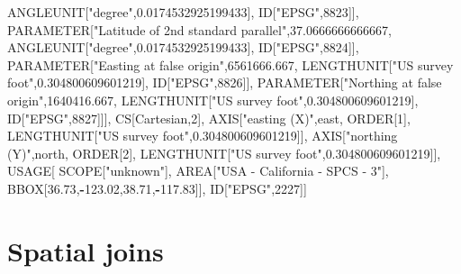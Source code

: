 \documentclass[
  12pt,
]{book}
\newenvironment{Shaded}{\begin{snugshade}}{\end{snugshade}}
\newcommand{\DecValTok}[1]{\textcolor[rgb]{0.00,0.00,0.81}{#1}}
\newcommand{\FloatTok}[1]{\textcolor[rgb]{0.00,0.00,0.81}{#1}}
\newcommand{\NormalTok}[1]{#1}
\newcommand{\OperatorTok}[1]{\textcolor[rgb]{0.81,0.36,0.00}{\textbf{#1}}}
\newcommand{\StringTok}[1]{\textcolor[rgb]{0.31,0.60,0.02}{#1}}
\begin{document}
\begin{Shaded}
\begin{Highlighting}[]
\NormalTok{            ANGLEUNIT[}\StringTok{"degree"}\NormalTok{,}\FloatTok{0.0174532925199433}\NormalTok{],}
\NormalTok{            ID[}\StringTok{"EPSG"}\NormalTok{,}\DecValTok{8823}\NormalTok{]],}
\NormalTok{        PARAMETER[}\StringTok{"Latitude of 2nd standard parallel"}\NormalTok{,}\FloatTok{37.0666666666667}\NormalTok{,}
\NormalTok{            ANGLEUNIT[}\StringTok{"degree"}\NormalTok{,}\FloatTok{0.0174532925199433}\NormalTok{],}
\NormalTok{            ID[}\StringTok{"EPSG"}\NormalTok{,}\DecValTok{8824}\NormalTok{]],}
\NormalTok{        PARAMETER[}\StringTok{"Easting at false origin"}\NormalTok{,}\FloatTok{6561666.667}\NormalTok{,}
\NormalTok{            LENGTHUNIT[}\StringTok{"US survey foot"}\NormalTok{,}\FloatTok{0.304800609601219}\NormalTok{],}
\NormalTok{            ID[}\StringTok{"EPSG"}\NormalTok{,}\DecValTok{8826}\NormalTok{]],}
\NormalTok{        PARAMETER[}\StringTok{"Northing at false origin"}\NormalTok{,}\FloatTok{1640416.667}\NormalTok{,}
\NormalTok{            LENGTHUNIT[}\StringTok{"US survey foot"}\NormalTok{,}\FloatTok{0.304800609601219}\NormalTok{],}
\NormalTok{            ID[}\StringTok{"EPSG"}\NormalTok{,}\DecValTok{8827}\NormalTok{]]],}
\NormalTok{    CS[Cartesian,}\DecValTok{2}\NormalTok{],}
\NormalTok{        AXIS[}\StringTok{"easting (X)"}\NormalTok{,east,}
\NormalTok{            ORDER[}\DecValTok{1}\NormalTok{],}
\NormalTok{            LENGTHUNIT[}\StringTok{"US survey foot"}\NormalTok{,}\FloatTok{0.304800609601219}\NormalTok{]],}
\NormalTok{        AXIS[}\StringTok{"northing (Y)"}\NormalTok{,north,}
\NormalTok{            ORDER[}\DecValTok{2}\NormalTok{],}
\NormalTok{            LENGTHUNIT[}\StringTok{"US survey foot"}\NormalTok{,}\FloatTok{0.304800609601219}\NormalTok{]],}
\NormalTok{    USAGE[}
\NormalTok{        SCOPE[}\StringTok{"unknown"}\NormalTok{],}
\NormalTok{        AREA[}\StringTok{"USA {-} California {-} SPCS {-} 3"}\NormalTok{],}
\NormalTok{        BBOX[}\FloatTok{36.73}\NormalTok{,}\OperatorTok{{-}}\FloatTok{123.02}\NormalTok{,}\FloatTok{38.71}\NormalTok{,}\OperatorTok{{-}}\FloatTok{117.83}\NormalTok{]],}
\NormalTok{    ID[}\StringTok{"EPSG"}\NormalTok{,}\DecValTok{2227}\NormalTok{]]}
\end{Highlighting}
\end{Shaded}

\hypertarget{spatial-joins}{%
\section{Spatial joins}\label{spatial-joins}}
\end{document}
